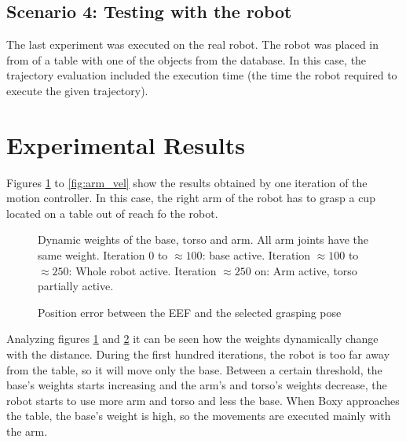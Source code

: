 \subsection{Scenario 4: Testing with the robot}

The last experiment was executed on the real robot. The robot was placed in from of a table with one of the objects from the database. In this case, the trajectory evaluation included the execution time (the time the robot required to execute the given trajectory).

\section{Experimental Results}



Figures \ref{fig:weights} to \ref{fig:arm_vel} show the results obtained by one iteration of the motion controller. In this case, the right arm of the robot has to grasp a cup located on a table out of reach fo the robot.

\begin{figure}[H]
	\centering
	
	\vspace{-20pt}
	\caption[Dynamic weights]{Dynamic weights of the base, torso and arm. All arm joints have the same weight. Iteration $0$ to $\approx100$: base active. Iteration $\approx100$ to $\approx250$: Whole robot active. Iteration $\approx250$ on: Arm active, torso partially active. } 
	\vspace{-15pt} \label{fig:weights}
\end{figure}
\begin{figure}[H]
	\centering
	
	\vspace{-20pt}
	\caption[Position Error]{Position error between the EEF and the selected grasping pose} 
	\vspace{-15pt} \label{fig:error}
\end{figure}
Analyzing figures \ref{fig:weights} and \ref{fig:error} it can be seen how the weights dynamically change with the distance. During the first hundred iterations, the robot is too far away from the table, so it will move only the base. Between a certain threshold, the base's weights starts increasing and the arm's and torso's weights decrease, the robot starts to use more arm and torso and less the base. When Boxy approaches the table, the base's weight is high, so the movements are executed mainly with the arm.

